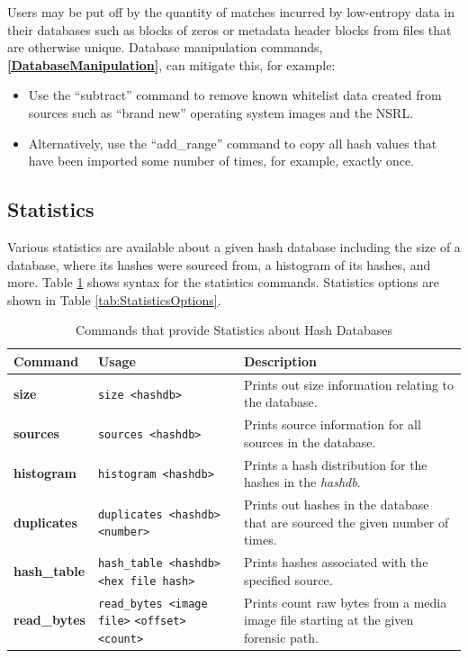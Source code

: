 \documentclass[11pt,fleqn]{article} %
\begin{document}
\begin{itemize}
Users may be put off by the quantity of matches incurred by low-entropy data in their databases such as blocks of zeros or metadata header blocks from files that are otherwise unique. Database manipulation commands,
\textbf{\autoref{DatabaseManipulation}}, can mitigate this, for example:
\begin{itemize}
\item Use the ``subtract'' command to remove known whitelist data created from sources such as ``brand new'' operating system images and the NSRL.
\item Alternatively, use the ``add\_range'' command to copy all hash values that have been imported some number of times, for example, exactly once.
\end{itemize}

\end{itemize}

\subsection{Statistics}
Various statistics are available about a given hash database including the size of a database, where its hashes were sourced from, a histogram of its hashes, and more.
Table \ref{tab:statistics} shows syntax for the statistics commands.
Statistics options are shown in Table \ref{tab:StatisticsOptions}.
\begin{table}[!ht]
\centering
\caption{Commands that provide Statistics about Hash Databases}
\label{tab:statistics}
\begin{tabular}{|p{3.5 cm}|p{6 cm}|p{4 cm}|}
\hline \hline
\textbf{Command} & \textbf{Usage} & \textbf{Description} \\
\hline
\textbf{size} & \verb+size <hashdb>+ & Prints out size information relating to the database.\\
\hline
\textbf{sources} & \verb+sources <hashdb>+ & Prints source information for all sources in the database.\\
\hline
\textbf{histogram} & \verb+histogram <hashdb>+ & Prints a hash distribution for the hashes in the \textit{hashdb}.\\
\hline
\textbf{duplicates} & \verb+duplicates <hashdb> <number>+ &  Prints out hashes in the database that are sourced the given number of times.\\
\hline
\textbf{hash\_table} & \verb+hash_table <hashdb>+ \verb+<hex file hash>+ &  Prints hashes associated with the specified source.\\
\hline
\textbf{read\_bytes} & \verb+read_bytes <image file>+ \verb+<offset> <count>+ &  Prints count raw bytes from a media image file starting at the given forensic path.\\
\hline
\end{tabular}
\end{table}
\end{document}

